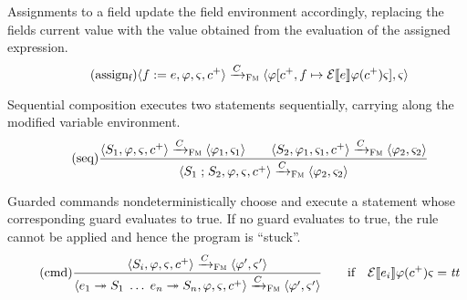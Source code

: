 \documentclass[a4paper,10pt,english]{article}
\begin{document}
Assignments to a field update the field environment accordingly, replacing the fields current value with the value
obtained from the evaluation of the assigned expression.
\begin{equation*}
	\tag{assign${}_\text{f}$}
	\configurationFm{\assignVarStm{\field}{\expr}, \fieldEnv, \varEnvFm, \toListNE{\comp}}
		\stmArrowFm
	\configurationFm{\fieldEnv[\toListNE{\comp}, \field \mapsto \ExprSem{\expr} \fieldEnv(\toListNE{\comp}) \varEnvFm], \varEnvFm}
\end{equation*}

Sequential composition executes two statements sequentially, carrying along the modified variable environment.
\begin{equation*}
	\tag{seq}
	\dfrac
	{
		\langle S_1, \varphi, \varsigma, c^+ \rangle
			\xrightarrow{C}_\textsc{Fm}
		\langle \varphi_1, \varsigma_1 \rangle
		\qquad
		\langle S_2, \varphi_1, \varsigma_1, c^+ \rangle
			\xrightarrow{C}_\textsc{Fm}
		\langle \varphi_2, \varsigma_2 \rangle
	}
	{
		\langle S_1 \; \mathtt{;} \; S_2, \varphi, \varsigma, c^+ \rangle
			\xrightarrow{C}_\textsc{Fm}
		\langle \varphi_2, \varsigma_2 \rangle
	}
\end{equation*}

Guarded commands nondeterministically choose and execute a statement whose corresponding guard evaluates to true. If no guard
evaluates to true, the rule cannot be applied and hence the program is ``stuck''.
\begin{equation*}
	\tag{cmd}
	\dfrac
	{
		\langle S_i, \varphi, \varsigma, c^+ \rangle
			\xrightarrow{C}_\textsc{Fm}
		\langle \varphi', \varsigma' \rangle
	}
	{
		\langle e_1 \; \mathtt{\twoheadrightarrow} \; S_1 \; \ldots \; e_n \; \mathtt{\twoheadrightarrow} \; S_n, \varphi, \varsigma,
		c^+ \rangle
			\xrightarrow{C}_\textsc{Fm}
		\langle \varphi', \varsigma' \rangle
	}
	\qquad \text{if} \quad \mathcal{E} \llbracket e_i \rrbracket \varphi(c^+) \varsigma = \mathit{tt}
\end{equation*}
\end{document}
